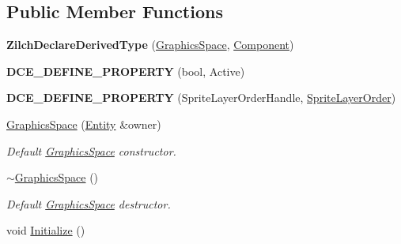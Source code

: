 \subsection*{Public Member Functions}
\begin{DoxyCompactItemize}
\item 
\hypertarget{classDCEngine_1_1Components_1_1GraphicsSpace_a0517df8d1aff1292a127a44e3ad97435}{{\bfseries Zilch\-Declare\-Derived\-Type} (\hyperlink{classDCEngine_1_1Components_1_1GraphicsSpace}{Graphics\-Space}, \hyperlink{classDCEngine_1_1Component}{Component})}\label{classDCEngine_1_1Components_1_1GraphicsSpace_a0517df8d1aff1292a127a44e3ad97435}

\item 
\hypertarget{classDCEngine_1_1Components_1_1GraphicsSpace_a10e2db679c93b1c4dc1dae817764eb71}{{\bfseries D\-C\-E\-\_\-\-D\-E\-F\-I\-N\-E\-\_\-\-P\-R\-O\-P\-E\-R\-T\-Y} (bool, Active)}\label{classDCEngine_1_1Components_1_1GraphicsSpace_a10e2db679c93b1c4dc1dae817764eb71}

\item 
\hypertarget{classDCEngine_1_1Components_1_1GraphicsSpace_a1640defc60c72ee32782f39f0232782c}{{\bfseries D\-C\-E\-\_\-\-D\-E\-F\-I\-N\-E\-\_\-\-P\-R\-O\-P\-E\-R\-T\-Y} (Sprite\-Layer\-Order\-Handle, \hyperlink{classDCEngine_1_1SpriteLayerOrder}{Sprite\-Layer\-Order})}\label{classDCEngine_1_1Components_1_1GraphicsSpace_a1640defc60c72ee32782f39f0232782c}

\item 
\hypertarget{classDCEngine_1_1Components_1_1GraphicsSpace_adc3dfe81fa608dfcb7528d2571016350}{\hyperlink{classDCEngine_1_1Components_1_1GraphicsSpace_adc3dfe81fa608dfcb7528d2571016350}{Graphics\-Space} (\hyperlink{classDCEngine_1_1Entity}{Entity} \&owner)}\label{classDCEngine_1_1Components_1_1GraphicsSpace_adc3dfe81fa608dfcb7528d2571016350}

\begin{DoxyCompactList}\small\item\em Default \hyperlink{classDCEngine_1_1Components_1_1GraphicsSpace}{Graphics\-Space} constructor. \end{DoxyCompactList}\item 
\hypertarget{classDCEngine_1_1Components_1_1GraphicsSpace_a677ad38c43b7f135a15f5816a47f1d75}{\hyperlink{classDCEngine_1_1Components_1_1GraphicsSpace_a677ad38c43b7f135a15f5816a47f1d75}{$\sim$\-Graphics\-Space} ()}\label{classDCEngine_1_1Components_1_1GraphicsSpace_a677ad38c43b7f135a15f5816a47f1d75}

\begin{DoxyCompactList}\small\item\em Default \hyperlink{classDCEngine_1_1Components_1_1GraphicsSpace}{Graphics\-Space} destructor. \end{DoxyCompactList}\item 
\hypertarget{classDCEngine_1_1Components_1_1GraphicsSpace_ab9aa5cb173fc1a216301e5633a8d97fd}{void \hyperlink{classDCEngine_1_1Components_1_1GraphicsSpace_ab9aa5cb173fc1a216301e5633a8d97fd}{Initialize} ()}\label{classDCEngine_1_1Components_1_1GraphicsSpace_ab9aa5cb173fc1a216301e5633a8d97fd}


\end{DoxyCompactItemize}
